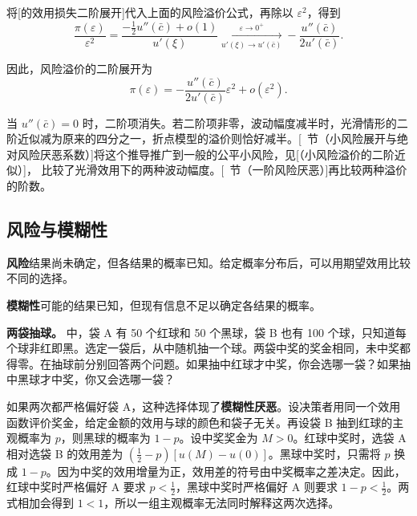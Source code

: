 将[的效用损失二阶展开]代入上面的风险溢价公式，再除以 $\varepsilon^2$，得到
\[
 \frac{\pi(\varepsilon)}{\varepsilon^2}
 =\frac{-\tfrac12 u''(\bar c)+o(1)}{u'(\xi)}
 \xrightarrow[u'(\xi)\to u'(\bar c)]{\varepsilon\to0^+} -\frac{u''(\bar c)}{2u'(\bar c)}.
\]

因此，风险溢价的二阶展开为
\[
 \pi(\varepsilon)=-\frac{u''(\bar c)}{2u'(\bar c)}\varepsilon^2
                   +o(\varepsilon^2).
\]

当 $u''(\bar c)=0$ 时，二阶项消失。若二阶项非零，波动幅度减半时，光滑情形的二阶近似减为原来的四分之一，折点模型的溢价则恰好减半。[~节（小风险展开与绝对风险厌恶系数）]将这个推导推广到一般的公平小风险，见[（小风险溢价的二阶近似）]， 比较了光滑效用下的两种波动幅度。[~节（一阶风险厌恶）]再比较两种溢价的阶数。

\subsection{风险与模糊性}
\begin{tcolorbox}[knowledge,title=风险与模糊性]
\textbf{风险}\quad 结果尚未确定，但各结果的概率已知。给定概率分布后，可以用期望效用比较不同的选择。

\textbf{模糊性}\quad 可能的结果已知，但现有信息不足以确定各结果的概率。
\end{tcolorbox}




\textbf{两袋抽球。} 中，袋 A 有 50 个红球和 50 个黑球，袋 B 也有 100 个球，只知道每个球非红即黑。选定一袋后，从中随机抽一个球。两袋中奖的奖金相同，未中奖都得零。在抽球前分别回答两个问题。如果抽中红球才中奖，你会选哪一袋？如果抽中黑球才中奖，你又会选哪一袋？

\begin{center}
\begin{minipage}{\linewidth}
%
\centering
{}
\end{minipage}
\end{center}

如果两次都严格偏好袋 A，这种选择体现了\textbf{模糊性厌恶}。设决策者用同一个效用函数评价奖金，给定金额的效用与球的颜色和袋子无关。再设袋 B 抽到红球的主观概率为 $p$，则黑球的概率为 $1-p$。设中奖奖金为 $M>0$。红球中奖时，选袋 A 相对选袋 B 的效用差为 $(\tfrac12-p)[u(M)-u(0)]$。黑球中奖时，只需将 $p$ 换成 $1-p$。因为中奖的效用增量为正，效用差的符号由中奖概率之差决定。因此，红球中奖时严格偏好 A 要求 $p<\tfrac12$，黑球中奖时严格偏好 A 则要求 $1-p<\tfrac12$。两式相加会得到 $1<1$，所以一组主观概率无法同时解释这两次选择。

